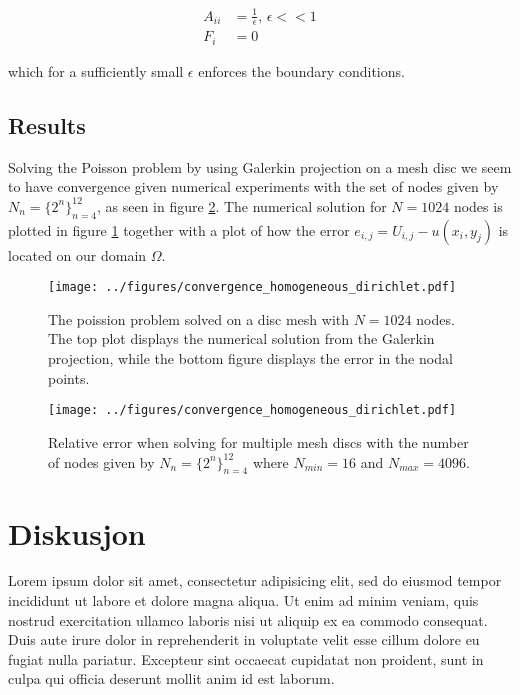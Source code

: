 \documentclass[5p,a4paper,english]{elsarticle}%
\begin{document}
\begin{equation*}
    \begin{aligned}
    A_{ii} &= \frac{1}{\epsilon}, \, \epsilon << 1 \\
    F_i &= 0
    \end{aligned}
\end{equation*}

which for a sufficiently small $\epsilon$ enforces the boundary conditions.


\subsection{Results}

Solving the Poisson problem by using Galerkin projection on a mesh disc we seem to have convergence given numerical experiments with
the set of nodes given by $N_n = \{ 2^n\}_{n=4}^{12}$, as seen in figure \ref{convergence}. The numerical solution for $N = 1024$ nodes is plotted in figure \ref{solution-error}
together with a plot of how the error $e_{i,j} = U_{i,j} - u(x_i,y_j)$ is located on our domain $\Omega$.

\begin{figure}[tbp]
    \centering
        \texttt{[image: ../figures/convergence\_homogeneous\_dirichlet.pdf]}
    \caption{The poission problem solved on a disc mesh with $N = 1024$ nodes.
    The top plot displays the numerical solution from the Galerkin projection,
    while the bottom figure displays the error in the nodal points.}
    \label{solution-error}
\end{figure}

\begin{figure}[tbp]
    \centering
        \texttt{[image: ../figures/convergence\_homogeneous\_dirichlet.pdf]}
    \caption{Relative error when solving for multiple mesh discs with the number of nodes given by $N_n = \{ 2^n\}_{n=4}^{12}$
    where $N_{min} = 16$ and $N_{max} = 4096$.}
    \label{convergence}
\end{figure}


\section{Diskusjon}
Lorem ipsum dolor sit amet, consectetur adipisicing elit, sed do eiusmod tempor incididunt ut labore et dolore magna aliqua. Ut enim ad minim veniam, quis nostrud exercitation ullamco laboris nisi ut aliquip ex ea commodo consequat. Duis aute irure dolor in reprehenderit in voluptate velit esse cillum dolore eu fugiat nulla pariatur. Excepteur sint occaecat cupidatat non proident, sunt in culpa qui officia deserunt mollit anim id est laborum.
\end{document}
